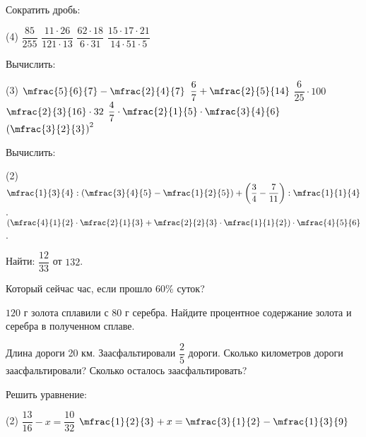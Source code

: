 \begin{homework}[number=2]
	\begin{listofex}
		\item Сократить дробь:
		\begin{tasks}(4)
			\task \( \dfrac{85}{255} \)
			\task \( \dfrac{11\cdot26}{121\cdot13} \)
			\task \( \dfrac{62\cdot18}{6\cdot31} \)
			\task \( \dfrac{15\cdot17\cdot21}{14\cdot51\cdot5} \)
		\end{tasks}
		\item Вычислить:
		\begin{tasks}(3)
			\task \( \mfrac{5}{6}{7}-\mfrac{2}{4}{7} \)
			\task \( \dfrac{6}{7}+\mfrac{2}{5}{14} \)
			\task \( \dfrac{6}{25}\cdot100 \)
			\task \( \mfrac{2}{3}{16}\cdot32 \)
			\task \( \dfrac{4}{7}\cdot\mfrac{2}{1}{5}\cdot\mfrac{3}{4}{6}\)
			\task \( \left( \mfrac{3}{2}{3} \right)^2 \)
		\end{tasks}
		\item Вычислить:
		\begin{tasks}(2)
			\task \( \mfrac{1}{3}{4}:\left( \mfrac{3}{4}{5}-\mfrac{1}{2}{5} \right)+\left( \dfrac{3}{4}-\dfrac{7}{11} \right):\mfrac{1}{1}{4} \).
			\task \( \left( \mfrac{4}{1}{2}\cdot\mfrac{2}{1}{3}+\mfrac{2}{2}{3}\cdot\mfrac{1}{1}{2} \right)\cdot\mfrac{4}{5}{6} \).
		\end{tasks}
		\item Найти: \( \dfrac{12}{33} \) от \( 132 \).
		\item Который сейчас час, если прошло  \( 60\% \) суток?
		\item \(120\) г золота сплавили с \(80\) г серебра. Найдите процентное содержание золота и серебра в полученном сплаве.
		\item Длина дороги 20 км. Заасфальтировали \( \dfrac{2}{5} \) дороги. Сколько километров дороги заасфальтировали? Сколько осталось заасфальтировать?
		\item Решить уравнение:
		\begin{tasks}(2)
			\task \( \dfrac{13}{16}-x=\dfrac{10}{32} \)
			\task \( \mfrac{1}{2}{3}+x=\mfrac{3}{1}{2}-\mfrac{1}{3}{9} \)
		\end{tasks}
	\end{listofex}
\end{homework}
%

